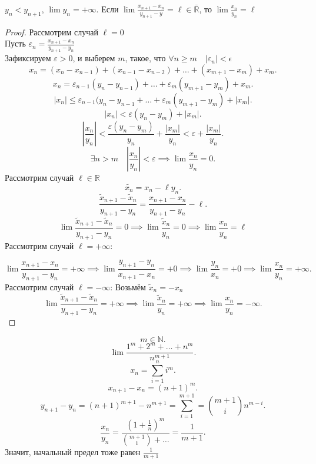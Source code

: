\documentclass[11pt, oneside]{article}   	%
\begin{document}
    \begin{theorem}
        $y_n < y_{n+1}$, $\lim y_n = +\infty$. Если $\lim \frac{x_{n+1}-x_n}{y_{n+1}-y} = \ell\in \overline{\mathbb{R}}$, то $\lim \frac{x_n}{y_n} = \ell$ 
        \begin{proof}
            Рассмотрим случай $\ell = 0$\\
            Пусть $\varepsilon_n = \frac{x_{n+1}-x_n}{y_{n+1}-y_n}$ \\
            Зафиксируем $\varepsilon > 0$, и выберем  $m$, такое, что  $\forall{n\ge m}\quad |\varepsilon_n| < \epsilon$\\
            \[ x_n = (x_n-x_{n-1})+(x_{n-1}-x_{n-2}) + \ldots + (x_{m+1} - x_m) + x_m .\]
            \[ x_n = \varepsilon_{n-1}(y_n-y_{n-1})+\ldots+\varepsilon_m(y_{m+1}-y_m)+x_m .\]
            \[ \left|x_n\right| \le \varepsilon_{n-1}(y_n-y_{n-1} + \ldots + \varepsilon_m(y_{m+1}-y_m)+\left|x_m\right| .\]
            \[ \left|x_n\right| < \varepsilon\left( y_n - y_m \right) + \left|x_m\right|  .\]
            \[ \left|\frac{x_n}{y_n}\right| < \frac{\varepsilon(y_n-y_m)}{y_n} + \frac{\left|x_m\right|}{y_n} < \varepsilon + \frac{|x_m|}{y_n} .\]
            \[ \exists{n > m}\quad \left|\frac{x_n}{y_n}\right| < \varepsilon \implies \lim \frac{x_n}{y_n} = 0 .\]
            Рассмотрим случай $\ell\in \mathbb{R}$ \\
            \[ \tilde{x_n} = x_n-\ell y_n .\]
            \[ \frac{\tilde{x}_{n+1}-\tilde{x}_n}{y_{n+1}-y_n} = \frac{x_{n+1}-x_n}{y_{n+1}-y_n} - \ell .\]
            \[ \lim \frac{\tilde{x}_{n+1}-\tilde{x}_n}{y_{n+1}-y_n} = 0 \implies \lim \frac{\tilde{x}_n}{y_n} = 0 \implies \lim \frac{x_n}{y_n} = \ell \]
            Рассмотрим случай $\ell = +\infty$:

            \[ \lim \frac{x_{n+1}-x_n}{y_{n+1}-y_n} = +\infty \implies \lim \frac{y_{n+1}-y_n}{x_{n+1}-x_n} = +0 \implies \lim \frac{y_n}{x_n} = +0 \implies \lim \frac{x_n}{y_n} = +\infty.\]
            Рассмотрим случай $\ell = -\infty$:
            Возьмём $\tilde{x}_n = -x_n$\\
            \[ \lim \frac{\tilde{x}_{n+1}-\tilde{x}_n}{y_{n+1}-y_n} = +\infty \implies \lim \frac{\tilde{x}_n}{y_n} = +\infty \implies \lim \frac{x_n}{y_n} = -\infty .\] 
        \end{proof}
        \begin{example}
            \[ m\in \mathbb{N} .\]
            \[ \lim \frac{1^{m}+2^{m}+\ldots+n^{m}}{n^{m+1}} .\] 
            \[ x_n = \sum\limits_{i=1}^{n} i^{m} .\]
            \[ x_{n+1}-x_{n} = (n+1)^{m} .\]
            \[ y_{n+1}-y_{n} = (n+1)^{m+1}-n^{m+1} = \sum\limits_{i=1}^{m+1} = \binom{m+1}{i}n^{m-i} .\]
            \[ \frac{x_n}{y_n} = \frac{\left(1+\frac{1}{n}\right)^{m}}{\binom{m+1}{1} + \ldots} = \frac{1}{m+1} .\]
            Значит, начальный предел тоже равен $\frac{1}{m+1}$
               
        \end{example}
    \end{theorem}
\end{document}
